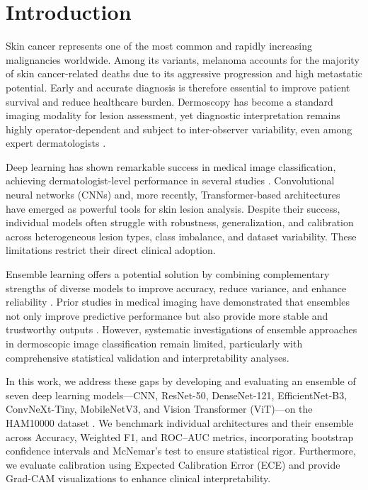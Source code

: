 \documentclass[preprint,12pt]{elsarticle}
\begin{document}
\section{Introduction}

Skin cancer represents one of the most common and rapidly increasing malignancies worldwide. Among its variants, melanoma accounts for the majority of skin cancer-related deaths due to its aggressive progression and high metastatic potential. Early and accurate diagnosis is therefore essential to improve patient survival and reduce healthcare burden. Dermoscopy has become a standard imaging modality for lesion assessment, yet diagnostic interpretation remains highly operator-dependent and subject to inter-observer variability, even among expert dermatologists \citep{tschandl2018ham10000}.

Deep learning has shown remarkable success in medical image classification, achieving dermatologist-level performance in several studies \citep{esteva2017dermatologist}. Convolutional neural networks (CNNs) and, more recently, Transformer-based architectures have emerged as powerful tools for skin lesion analysis. Despite their success, individual models often struggle with robustness, generalization, and calibration across heterogeneous lesion types, class imbalance, and dataset variability. These limitations restrict their direct clinical adoption.

Ensemble learning offers a potential solution by combining complementary strengths of diverse models to improve accuracy, reduce variance, and enhance reliability \cite{dietterich2000ensemble}. Prior studies in medical imaging have demonstrated that ensembles not only improve predictive performance but also provide more stable and trustworthy outputs \cite{valverde2021ensembles}. However, systematic investigations of ensemble approaches in dermoscopic image classification remain limited, particularly with comprehensive statistical validation and interpretability analyses.

In this work, we address these gaps by developing and evaluating an ensemble of seven deep learning models---CNN, ResNet-50, DenseNet-121, EfficientNet-B3, ConvNeXt-Tiny, MobileNetV3, and Vision Transformer (ViT)---on the HAM10000 dataset \cite{tschandl2018ham10000}. We benchmark individual architectures and their ensemble across Accuracy, Weighted F1, and ROC--AUC metrics, incorporating bootstrap confidence intervals and McNemar’s test to ensure statistical rigor. Furthermore, we evaluate calibration using Expected Calibration Error (ECE) and provide Grad-CAM visualizations to enhance clinical interpretability.
\end{document}
